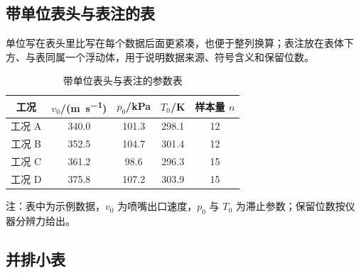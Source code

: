 \subsection{带单位表头与表注的表}

单位写在表头里比写在每个数据后面更紧凑，也便于整列换算；表注放在表体下方、与表同属一个浮动体，用于说明数据来源、符号含义和保留位数。
\begin{table}[htbp]
  \centering
  \caption{带单位表头与表注的参数表}
  \label{tab:units}
  \begin{tabular}{ccccc}
    \toprule
    \textbf{工况} & $v_0$/(\si{\meter\per\second}) & $p_0$/\si{\kilo\pascal} & $T_0$/\si{\kelvin} & 样本量 $n$\\
    \midrule
    工况 A & 340.0 & 101.3 & 298.1 & 12\\
    工况 B & 352.5 & 104.7 & 301.4 & 12\\
    工况 C & 361.2 & 98.6 & 296.3 & 15\\
    工况 D & 375.8 & 107.2 & 303.9 & 15\\
    \bottomrule
  \end{tabular}

  \smallskip
  \begin{minipage}{0.9\textwidth}\footnotesize
    注：表中为示例数据，$v_0$ 为喷嘴出口速度，$p_0$ 与 $T_0$ 为滞止参数；保留位数按仪器分辨力给出。
  \end{minipage}
\end{table}

\subsection{并排小表}


